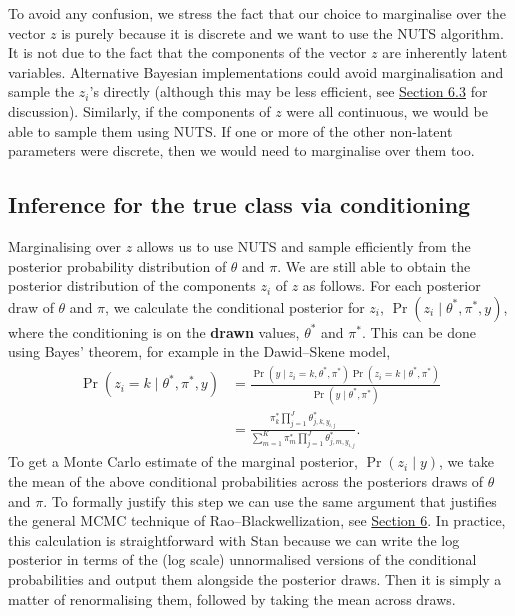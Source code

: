 To avoid any confusion, we stress the fact that our choice to
marginalise over the vector \(z\) is purely because it is discrete and we
want to use the NUTS algorithm. It is not due to the fact that the
components of the vector \(z\) are inherently latent variables.
Alternative Bayesian implementations could avoid marginalisation and
sample the \({z}_{i}\)'s directly (although this may be less efficient,
see \protect\hyperlink{sec:marginalisation-effciency}{Section 6.3} for discussion). Similarly, if
the components of \(z\) were all continuous, we would be able to sample
them using NUTS. If one or more of the other non-latent parameters were
discrete, then we would need to marginalise over them too.

\hypertarget{sec:conditioning}{%
\subsection{Inference for the true class via conditioning}\label{sec:conditioning}}

Marginalising over \(z\) allows us to use NUTS and sample efficiently from
the posterior probability distribution of \(\theta\) and \(\pi\). We are
still able to obtain the posterior distribution of the components
\({z}_{i}\) of \(z\) as follows. For each posterior draw of \(\theta\) and
\(\pi\), we calculate the conditional posterior for \({z}_{i}\),
\(\Pr({z}_{i} \mid \theta^*, \pi^*, y)\), where the conditioning is on the
\textbf{drawn} values, \(\theta^*\) and \(\pi^*\). This can be done using Bayes'
theorem, for example in the Dawid--Skene model,
\[
\begin{aligned}
   \Pr(z_i = k \mid \theta^*, \pi^*, y)
&= \frac{\Pr(y \mid z_i = k, \theta^*, \pi^*)
         \Pr(z_i = k \mid \theta^*, \pi^*)}
        {\Pr(y \mid \theta^*, \pi^*)} \\
&= \frac{\pi^*_k \prod_{j = 1}^{J}
         \theta^*_{j, k, y_{i,j}}}
        {\sum_{m = 1}^{K} \pi^*_m \prod_{j = 1}^{J} \theta^*_{j, m, y_{i,j}}}.
\end{aligned}
\]
To get a Monte Carlo estimate of the marginal posterior,
\(\Pr({z}_{i} \mid y)\), we take the mean of the above conditional
probabilities across the posteriors draws of \(\theta\) and \(\pi\). To
formally justify this step we can use the same argument that justifies
the general MCMC technique of Rao--Blackwellization, see
\protect\hyperlink{sec:rao-blackwellization}{Section 6}. In practice, this calculation is
straightforward with Stan because we can write the log posterior in
terms of the (log scale) unnormalised versions of the conditional
probabilities and output them alongside the posterior draws. Then it is
simply a matter of renormalising them, followed by taking the mean
across draws.

